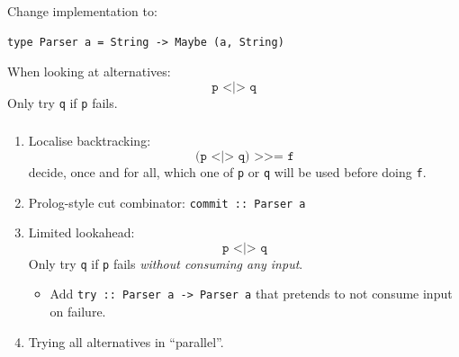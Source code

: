 \documentclass{beamer}
\newenvironment{slide}[1]{\begin{frame}\frametitle{#1}}{\end{frame}}
\newenvironment{verbslide}[1]{\begin{frame}[containsverbatim]\frametitle{#1}}{\end{frame}}
\newcommand{\titlecard}[1]{\begin{frame}\begin{center}\usebeamercolor[fg]{frametitle}\usebeamerfont{frametitle}#1\end{center}\end{frame}}
\begin{document}




\begin{verbslide}{}
  Change implementation to:
\begin{verbatim}
type Parser a = String -> Maybe (a, String)
\end{verbatim}

  \bigskip

  When looking at alternatives:
  \begin{displaymath}
    \texttt{p <|> q}
  \end{displaymath}
  Only try \texttt{q} if \texttt{p} fails.
\end{verbslide}

\begin{slide}{}
  \begin{enumerate}
  \item Localise backtracking:
    \begin{displaymath}
      \texttt{(p <|> q) >>= f}
    \end{displaymath}
    decide, once and for all, which one of \texttt{p} or \texttt{q}
    will be used before doing \texttt{f}.
  \item Prolog-style cut combinator: \texttt{commit :: Parser a}
  \item Limited lookahead:
    \begin{displaymath}
      \texttt{p <|> q}
    \end{displaymath}
    Only try \texttt{q} if \texttt{p} fails \emph{without consuming
      any input}.
    \begin{itemize}
    \item Add \texttt{try :: Parser a -> Parser a} that pretends to
      not consume input on failure.
    \end{itemize}
  \item Trying all alternatives in ``parallel''.
  \end{enumerate}
\end{slide}
\end{document}
